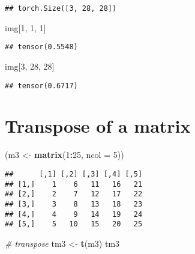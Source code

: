 \documentclass[]{book}
\newenvironment{Shaded}{\begin{snugshade}}{\end{snugshade}}
\newcommand{\CommentTok}[1]{\textcolor[rgb]{0.56,0.35,0.01}{\textit{#1}}}
\newcommand{\DataTypeTok}[1]{\textcolor[rgb]{0.13,0.29,0.53}{#1}}
\newcommand{\DecValTok}[1]{\textcolor[rgb]{0.00,0.00,0.81}{#1}}
\newcommand{\KeywordTok}[1]{\textcolor[rgb]{0.13,0.29,0.53}{\textbf{#1}}}
\newcommand{\NormalTok}[1]{#1}
\newcommand{\OperatorTok}[1]{\textcolor[rgb]{0.81,0.36,0.00}{\textbf{#1}}}
\newcommand{\StringTok}[1]{\textcolor[rgb]{0.31,0.60,0.02}{#1}}
\begin{document}
\begin{verbatim}
## torch.Size([3, 28, 28])
\end{verbatim}

\begin{Shaded}
\begin{Highlighting}[]
\NormalTok{img[}\DecValTok{1}\NormalTok{, }\DecValTok{1}\NormalTok{, }\DecValTok{1}\NormalTok{]}
\end{Highlighting}
\end{Shaded}

\begin{verbatim}
## tensor(0.5548)
\end{verbatim}

\begin{Shaded}
\begin{Highlighting}[]
\NormalTok{img[}\DecValTok{3}\NormalTok{, }\DecValTok{28}\NormalTok{, }\DecValTok{28}\NormalTok{]}
\end{Highlighting}
\end{Shaded}

\begin{verbatim}
## tensor(0.6717)
\end{verbatim}

\hypertarget{transpose-of-a-matrix}{%
\section{Transpose of a matrix}\label{transpose-of-a-matrix}}

\begin{Shaded}
\begin{Highlighting}[]
\NormalTok{(m3 <-}\StringTok{ }\KeywordTok{matrix}\NormalTok{(}\DecValTok{1}\OperatorTok{:}\DecValTok{25}\NormalTok{, }\DataTypeTok{ncol =} \DecValTok{5}\NormalTok{))}
\end{Highlighting}
\end{Shaded}

\begin{verbatim}
##      [,1] [,2] [,3] [,4] [,5]
## [1,]    1    6   11   16   21
## [2,]    2    7   12   17   22
## [3,]    3    8   13   18   23
## [4,]    4    9   14   19   24
## [5,]    5   10   15   20   25
\end{verbatim}

\begin{Shaded}
\begin{Highlighting}[]
\CommentTok{# transpose}
\NormalTok{tm3 <-}\StringTok{ }\KeywordTok{t}\NormalTok{(m3)}
\NormalTok{tm3}
\end{Highlighting}
\end{Shaded}
\end{document}
